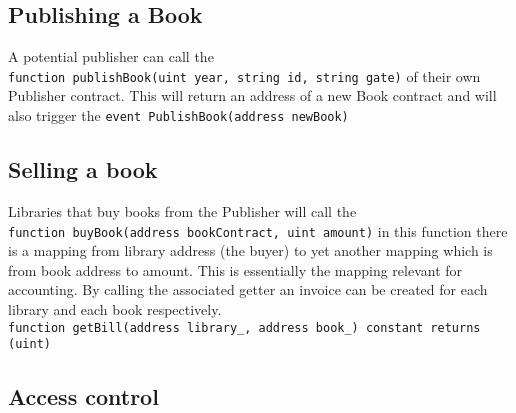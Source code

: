 \subsection{Publishing a Book}
A potential publisher can call the\\ 
 \verb|function publishBook(uint year, string id, string gate)| of their own Publisher contract. This will return an address of a new Book contract and will also trigger the 
 \verb|event PublishBook(address newBook)|
\subsection{Selling a book}
Libraries that buy books from the Publisher will call the \\
\verb|function buyBook(address bookContract, uint amount)|  in this function there is a mapping from library address (the buyer) to yet another mapping which is from book address to amount. This is essentially the mapping relevant for accounting. By calling the associated getter an invoice can be created for each library and each book respectively.\\
 \verb|function getBill(address library_, address book_) constant returns (uint)|
\subsection{Access control}


